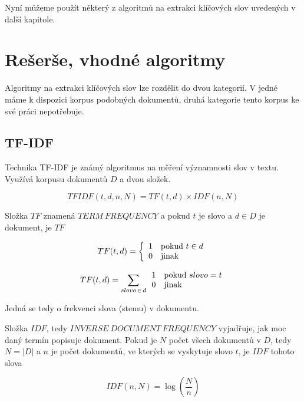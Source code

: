 Nyní můžeme použít některý z algoritmů na extrakci klíčových slov uvedených v další kapitole.

\section{Rešerše, vhodné algoritmy}

Algoritmy na extrakci klíčových slov lze rozdělit do dvou kategorií. V jedné máme k dispozici korpus podobných dokumentů, druhá kategorie tento korpus ke své práci nepotřebuje.

\subsection{TF-IDF}

Technika TF-IDF je známý algoritmus na měření významnosti slov v textu. Využívá korpusu dokumentů $D$ a dvou složek. 

\begin{equation}
  TFIDF(t,d,n,N)= TF(t,d)\times IDF(n,N)
\end{equation}

Složka $TF$ znamená $TERM\ FREQUENCY$ a pokud $t$ je slovo a $d \in D$ je dokument, je $TF$

\begin{equation}
 TF(t,d) = \left\{ \begin{array}{l l} 1 & \mathrm{pokud}\ t \in d \\
  0 & \mathrm{jinak} \end{array} \right.
\end{equation}

\begin{equation}
 TF(t,d) = \sum_{slovo\,\in\,d} \begin{array}{l l} 1 & \mathrm{pokud}\ slovo = t \\
  0 & \mathrm{jinak} \end{array}
\end{equation}

Jedná se tedy o frekvenci slova (stemu) v dokumentu.

Složka $IDF$, tedy $INVERSE\ DOCUMENT\ FREQUENCY$ vyjadřuje, jak moc daný termín popisuje dokument. Pokud je $N$ počet všech dokumentů v $D$, tedy $N = |D|$ a $n$ je počet dokumentů, ve kterých se vyskytuje slovo $t$, je $IDF$ tohoto slova

\begin{equation}
IDF(n,N) = \log \left(\frac{N}{n}\right)
\end{equation}

